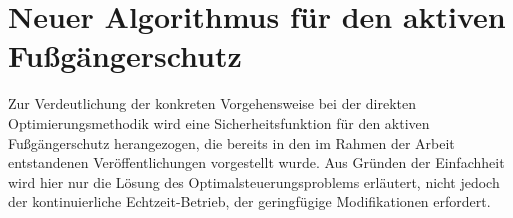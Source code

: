 






\section{Neuer Algorithmus für den aktiven Fußgängerschutz} \label{sec:nmpc_beispiel} 
%
%

Zur Verdeutlichung der konkreten Vorgehensweise bei der direkten Optimierungsmethodik wird eine Sicherheitsfunktion für den aktiven Fußgängerschutz herangezogen, die bereits in den im Rahmen der Arbeit entstandenen Veröffentlichungen  vorgestellt wurde. Aus Gründen der Einfachheit wird hier nur die Lösung des Optimalsteuerungsproblems erläutert, nicht jedoch der kontinuierliche Echtzeit-Betrieb, der geringfügige Modifikationen erfordert.

